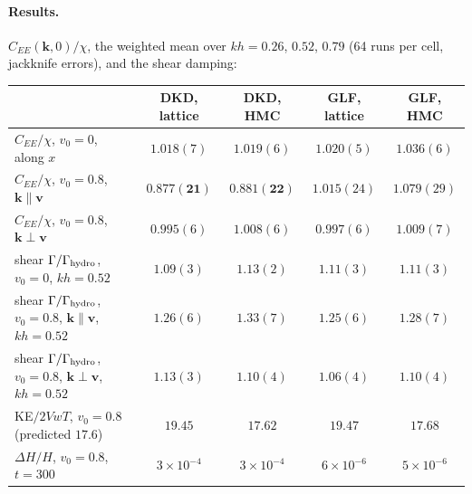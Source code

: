 \documentclass[11pt,aps,preprint,nofootinbib,superscriptaddress,tightenlines]{revtex4-2}
\let\oldparagraph\paragraph
\renewcommand{\paragraph}{\par\bigskip\oldparagraph}
\begin{document}
\paragraph{Results.}  $C_{EE}(\bm k,0)/\chi$, the weighted mean over $kh=0.26$, $0.52$, $0.79$ (64 runs per cell, jackknife errors), and the
shear damping:
\begin{center}
\begin{tabular}{lcccc}
\hline
 & DKD, lattice & DKD, HMC & GLF, lattice & GLF, HMC \\ \hline
$C_{EE}/\chi$, $v_0=0$, along $x$ & $1.018(7)$ & $1.019(6)$ & $1.020(5)$ & $1.036(6)$ \\
$C_{EE}/\chi$, $v_0=0.8$, $\bm k\parallel\bm v$ & $\mathbf{0.877(21)}$ & $\mathbf{0.881(22)}$ & $1.015(24)$ & $1.079(29)$ \\
$C_{EE}/\chi$, $v_0=0.8$, $\bm k\perp\bm v$ & $0.995(6)$ & $1.008(6)$ & $0.997(6)$ & $1.009(7)$ \\
shear $\Gamma/\Gamma_{\rm hydro}$, $v_0=0$, $kh=0.52$ & $1.09(3)$ & $1.13(2)$ & $1.11(3)$ & $1.11(3)$ \\
shear $\Gamma/\Gamma_{\rm hydro}$, $v_0=0.8$, $\bm k\parallel\bm v$, $kh=0.52$ & $1.26(6)$ & $1.33(7)$ & $1.25(6)$ & $1.28(7)$ \\
shear $\Gamma/\Gamma_{\rm hydro}$, $v_0=0.8$, $\bm k\perp\bm v$, $kh=0.52$ & $1.13(3)$ & $1.10(4)$ & $1.06(4)$ & $1.10(4)$ \\
KE$/2VwT$, $v_0=0.8$ (predicted $17.6$) & $19.45$ & $17.62$ & $19.47$ & $17.68$ \\
$\Delta H/H$, $v_0=0.8$, $t=300$ & $3\times10^{-4}$ & $3\times10^{-4}$ & $6\times10^{-6}$ & $5\times10^{-6}$ \\
\hline
\end{tabular}
\end{center}
\end{document}
